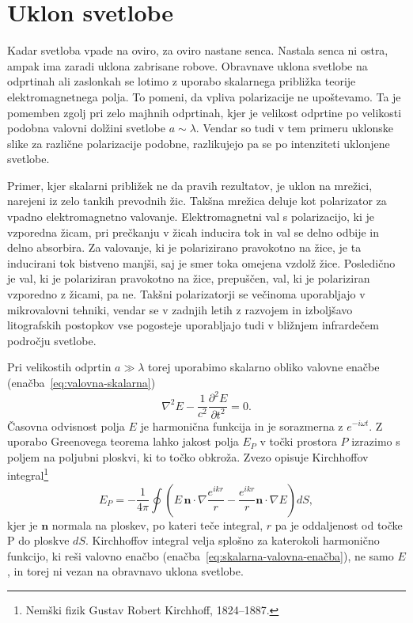 \section{Uklon svetlobe}
Kadar svetloba vpade na oviro, za oviro nastane senca. Nastala senca ni ostra, ampak
ima zaradi uklona zabrisane robove. Obravnave 
uklona svetlobe na odprtinah ali zaslonkah se lotimo z uporabo
skalarnega približka teorije elektromagnetnega polja. To pomeni, da vpliva 
polarizacije ne upoštevamo. Ta je pomemben zgolj pri zelo majhnih odprtinah, 
kjer je velikost odprtine po velikosti podobna valovni dolžini svetlobe $a \sim \lambda$. 
Vendar so tudi v tem primeru uklonske slike za različne polarizacije podobne, 
razlikujejo pa se po intenziteti uklonjene svetlobe.

\begin{remark}
Primer, kjer skalarni približek ne da pravih rezultatov, je uklon na mrežici, narejeni 
iz zelo tankih prevodnih žic. Takšna mrežica deluje kot polarizator za vpadno elektromagnetno valovanje.
Elektromagnetni val s polarizacijo, ki je vzporedna žicam, pri prečkanju v žicah inducira tok
in val se delno odbije in delno absorbira. Za valovanje, ki je polarizirano pravokotno 
na žice, je ta inducirani tok bistveno manjši, saj je smer toka omejena
vzdolž žice. Posledično je val, ki je polariziran pravokotno na žice, prepuščen, 
val, ki je polariziran vzporedno z žicami, pa ne. 
Takšni polarizatorji se večinoma uporabljajo v mikrovalovni tehniki, 
vendar se v zadnjih letih z razvojem in izboljšavo litografskih postopkov
vse pogosteje uporabljajo tudi v bližnjem infrardečem področju svetlobe.
\end{remark}

Pri velikostih odprtin $a\gg\lambda$ torej uporabimo skalarno obliko valovne enačbe 
(enačba~\ref{eq:valovna-skalarna})
\begin{equation}
\nabla^2 E - \frac{1}{c^2}\frac{\partial^2 E}{\partial t^2} = 0.
\label{eq:skalarna-valovna-enačba}
\end{equation}
Časovna odvisnost polja $E$ je harmonična funkcija in 
je sorazmerna z $e^{-i \omega t}$. Z uporabo Greenovega teorema lahko 
jakost polja $E_P$ v točki prostora $P$ izrazimo s poljem na 
poljubni ploskvi, ki to točko obkroža. 
Zvezo opisuje Kirchhoffov integral\footnote{Nemški fizik Gustav Robert Kirchhoff, 1824--1887.} 
\begin{equation}
E_P = -\frac{1}{4\pi}\oint \left(E\,\mathbf{n}\cdot \nabla \frac{e^{ikr}}{r}-
\frac{e^{ikr}}{r}\mathbf{n}\cdot \nabla E \right) dS,
\label{eq:Kirchhoffov-integral}
\end{equation}
kjer je $\mathbf{n}$ normala na ploskev, po kateri teče integral, $r$ pa je oddaljenost od točke P
do ploskve $dS$. Kirchhoffov integral velja splošno za katerokoli harmonično 
funkcijo, ki reši valovno enačbo (enačba~\ref{eq:skalarna-valovna-enačba}), ne samo $E$, in torej
ni vezan na obravnavo uklona svetlobe. 

